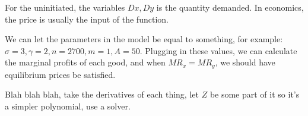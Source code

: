 For the uninitiated, the variables $Dx, Dy$ is the quantity demanded. In economics, the price is usually the input of the function. 

We can let the parameters in the model be equal to something, for example: $\sigma =3, \gamma = 2, n = 2700, m = 1, A = 50$.  Plugging in these values, we can calculate the marginal profits of each good, and when $MR_x = MR_y$, we should have equilibrium prices be satisfied.

Blah blah blah, take the derivatives of each thing, let $Z$ be some part of it so it's a simpler polynomial, use a solver. 

